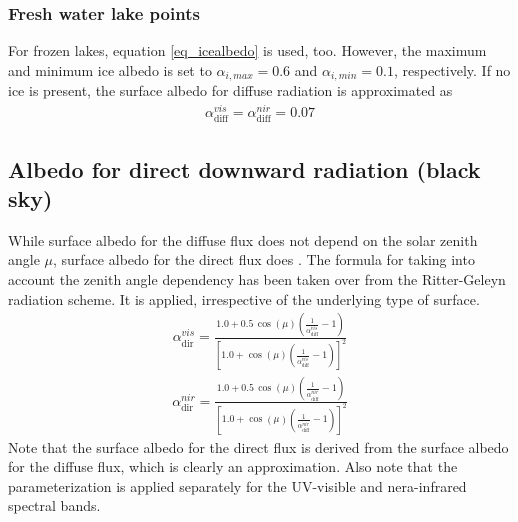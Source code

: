 \documentclass[a4paper,11pt]{article}
\begin{document}
\subsubsection{Fresh water lake points}
For frozen lakes, equation \ref{eq_icealbedo} is used, too. However, the maximum and minimum ice albedo is set to $\alpha_{i,max}=0.6$ and $\alpha_{i,min}=0.1$, respectively. 
If no ice is present, the surface albedo for diffuse radiation is approximated as
\begin{align}
   \alpha_{\mathrm{diff}}^{vis} = \alpha_{\mathrm{diff}}^{nir} =0.07
\end{align}
 

\subsection{Albedo for direct downward radiation (black sky)}
While surface albedo for the diffuse flux does not depend on the solar zenith angle $\mu$, surface albedo for the direct flux does \citep{Yang:2008}. The formula for taking into account 
the zenith angle dependency has been taken over from the Ritter-Geleyn radiation scheme. It is applied, irrespective of the underlying type of surface.
\begin{align}
  \alpha_{\mathrm{dir}}^{vis} = \frac{1.0 + 0.5\, \cos(\mu)  \left(\frac{1}{\alpha_{\mathrm{diff}}^{vis}}-1\right)}
                              {\left[1.0 + \cos(\mu)  \left(\frac{1}{\alpha_{\mathrm{diff}}^{vis}}-1\right)\right]^{2}}
\end{align}
\begin{align}
  \alpha_{\mathrm{dir}}^{nir} = \frac{1.0 + 0.5\, \cos(\mu)  \left(\frac{1}{\alpha_{\mathrm{diff}}^{nir}}-1\right)}
                              {\left[1.0 + \cos(\mu)  \left(\frac{1}{\alpha_{\mathrm{diff}}^{nir}}-1\right)\right]^{2}}
\end{align}
Note that the surface albedo for the direct flux is derived from the surface albedo for the diffuse flux, which is clearly an approximation. Also note that the parameterization is 
applied separately for the UV-visible and nera-infrared spectral bands.
\end{document}

